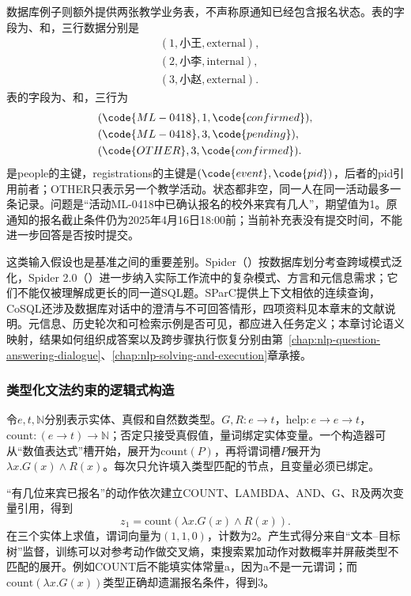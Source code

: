 数据库例子则额外提供两张教学业务表，不声称原通知已经包含报名状态。表的字段为、和，三行数据分别是
\[
\begin{aligned}
 &(1,\text{小王},\text{external}),\\
 &(2,\text{小李},\text{internal}),\\
 &(3,\text{小赵},\text{external}).
\end{aligned}
\]
表的字段为、和，三行为
\[
\begin{split}
 &(\code{ML-0418},1,\code{confirmed}),\\
 &(\code{ML-0418},3,\code{pending}),\\
 &(\code{OTHER},3,\code{confirmed}).
\end{split}
\]
是people的主键，registrations的主键是$(\code{event},\code{pid})$，后者的pid引用前者；OTHER只表示另一个教学活动。状态都非空，同一人在同一活动最多一条记录。问题是“活动ML-0418中已确认报名的校外来宾有几人”，期望值为1。原通知的报名截止条件仍为2025年4月16日18:00前；当前补充表没有提交时间，不能进一步回答是否按时提交。

这类输入假设也是基准之间的重要差别。Spider（\citeyear{yu-etal-2018-spider}）按数据库划分考查跨域模式泛化，Spider 2.0（\citeyear{nlp-analysis-spider2025}）进一步纳入实际工作流中的复杂模式、方言和元信息需求；它们不能仅被理解成更长的同一道SQL题。SParC提供上下文相依的连续查询，CoSQL还涉及数据库对话中的澄清与不可回答情形，四项资料见本章末的文献说明。元信息、历史轮次和可检索示例是否可见，都应进入任务定义；本章讨论语义映射，结果如何组织成答案以及跨步骤执行恢复分别由第~\ref{chap:nlp-question-answering-dialogue}、\ref{chap:nlp-solving-and-execution}章承接。

\subsubsection{类型化文法约束的逻辑式构造}
\label{sec:nlp-analysis-typed-logic}

令$e,t,\mathbb N$分别表示实体、真假和自然数类型。$G,R:e\to t$，$\mathrm{help}:e\to e\to t$，$\mathrm{count}:(e\to t)\to\mathbb N$；否定只接受真假值，量词绑定实体变量。一个构造器可从“数值表达式”槽开始，展开为$\mathrm{count}(P)$，再将谓词槽$P$展开为$\lambda x.G(x)\land R(x)$。每次只允许填入类型匹配的节点，且变量必须已绑定。

“有几位来宾已报名”的动作依次建立COUNT、LAMBDA、AND、G、R及两次变量引用，得到
\[
 z_1=\mathrm{count}(\lambda x.G(x)\land R(x)).
\]
在三个实体上求值，谓词向量为$(1,1,0)$，计数为2。产生式得分来自“文本--目标树”监督，训练可以对参考动作做交叉熵，束搜索累加动作对数概率并屏蔽类型不匹配的展开。例如COUNT后不能填实体常量a，因为a不是一元谓词；而$\mathrm{count}(\lambda x.G(x))$类型正确却遗漏报名条件，得到3。

